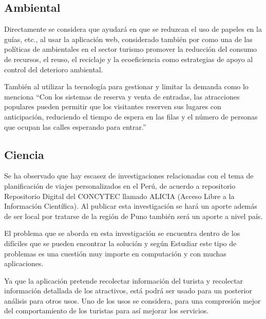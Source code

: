 \subsection{Ambiental}
Directamente se considera que ayudará en que se reduzcan el uso de papeles en la guías, etc., al usar la aplicación web, considerado también por  como una de las políticas de ambientales en el sector turismo promover la reducción del consumo de recursos, el reuso, el reciclaje y la ecoeficiencia como estrategias de apoyo al control del deterioro ambiental.  

También al utilizar la tecnología para gestionar y limitar la demanda como lo menciona  “Con los sistemas de reserva y venta de entradas, las atracciones populares pueden permitir que los visitantes reserven sus lugares con anticipación, reduciendo el tiempo de espera en las filas y el número de personas que ocupan las calles esperando para entrar.”
\subsection{Ciencia}
Se ha observado que hay escasez de investigaciones relacionadas con el tema de planificación de viajes personalizados en el Perú, de acuerdo a repositorio Repositorio Digital del CONCYTEC llamado ALICIA (Acceso Libre a la Información Científica). Al publicar esta investigación se hará un aporte además de ser local por tratarse de la región de Puno también será un aporte a nivel país.

El problema que se aborda en esta investigación se encuentra dentro de los difíciles que se pueden encontrar la solución y según  Estudiar este tipo de problemas es una cuestión muy importe en computación y con muchas aplicaciones.

Ya que la aplicación pretende recolectar información del turista y recolectar información detallada de los atractivos, está podrá ser usado para un posterior análisis para otros usos. Uno de los usos se considera, para una compresión mejor del comportamiento de los turistas para así mejorar los servicios.
